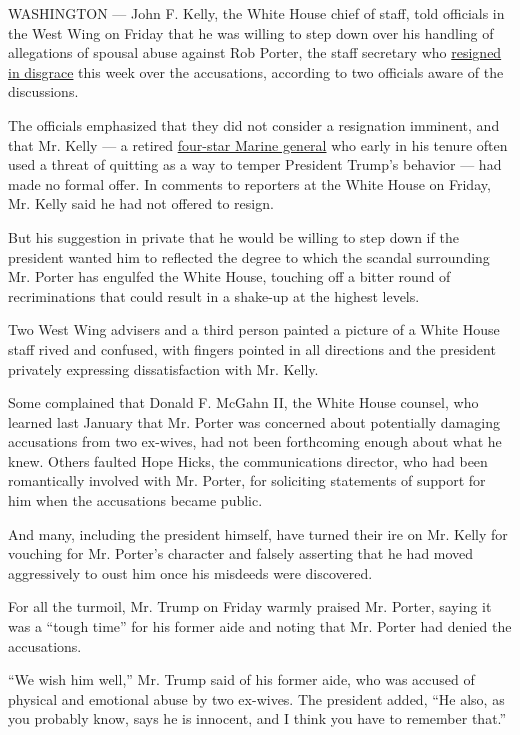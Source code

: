 WASHINGTON --- John F. Kelly, the White House chief of staff, told
officials in the West Wing on Friday that he was willing to step down
over his handling of allegations of spousal abuse against Rob Porter,
the staff secretary who
\href{https://www.nytimes3xbfgragh.onion/2018/02/07/us/politics/rob-porter-resigns-abuse-white-house-staff-secretary.html}{resigned
in disgrace} this week over the accusations, according to two officials
aware of the discussions.

The officials emphasized that they did not consider a resignation
imminent, and that Mr. Kelly --- a retired
\href{https://www.nytimes3xbfgragh.onion/2018/02/08/us/politics/kelly-trump.html}{four-star
Marine general} who early in his tenure often used a threat of quitting
as a way to temper President Trump's behavior --- had made no formal
offer. In comments to reporters at the White House on Friday, Mr. Kelly
said he had not offered to resign.

But his suggestion in private that he would be willing to step down if
the president wanted him to reflected the degree to which the scandal
surrounding Mr. Porter has engulfed the White House, touching off a
bitter round of recriminations that could result in a shake-up at the
highest levels.

Two West Wing advisers and a third person painted a picture of a White
House staff rived and confused, with fingers pointed in all directions
and the president privately expressing dissatisfaction with Mr. Kelly.

Some complained that Donald F. McGahn II, the White House counsel, who
learned last January that Mr. Porter was concerned about potentially
damaging accusations from two ex-wives, had not been forthcoming enough
about what he knew. Others faulted Hope Hicks, the communications
director, who had been romantically involved with Mr. Porter, for
soliciting statements of support for him when the accusations became
public.

And many, including the president himself, have turned their ire on Mr.
Kelly for vouching for Mr. Porter's character and falsely asserting that
he had moved aggressively to oust him once his misdeeds were discovered.

For all the turmoil, Mr. Trump on Friday warmly praised Mr. Porter,
saying it was a ``tough time'' for his former aide and noting that Mr.
Porter had denied the accusations.

``We wish him well,'' Mr. Trump said of his former aide, who was accused
of physical and emotional abuse by two ex-wives. The president added,
``He also, as you probably know, says he is innocent, and I think you
have to remember that.''

